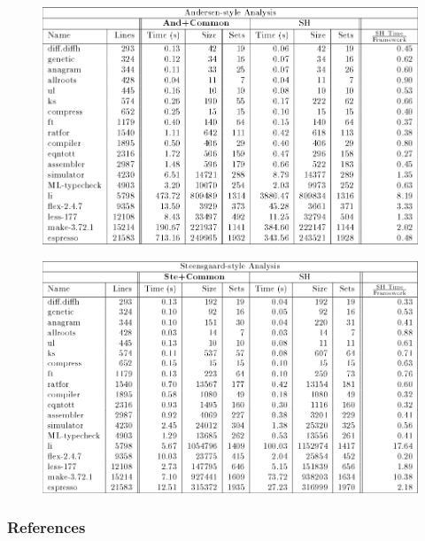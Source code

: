 \documentclass{beamer}
\begin{document}
\begin{frame}
  \begin{figure}
    \centering
    \includegraphics[scale=0.3]{andersen_comparison.png}
  \end{figure}
\end{frame}

\begin{frame}
  \begin{figure}
    \centering
    \includegraphics[scale=0.3]{steensgard_comparison.png}
  \end{figure}
\end{frame}

\begin{frame}[allowframebreaks]
  \frametitle{References}
  
  
\end{frame}
\end{document}
